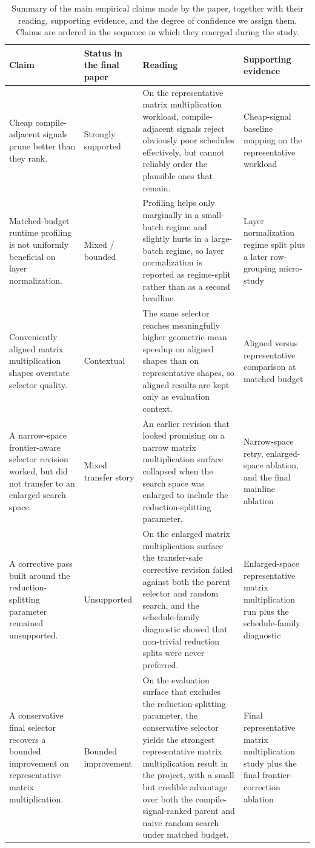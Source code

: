 \begin{table}[t]
\centering
\small
\begin{tabular}{p{}p{}p{}p{}}
\toprule
Claim & Status in the final paper & Reading & Supporting evidence \\
\midrule
Cheap compile-adjacent signals prune better than they rank. & Strongly supported & On the representative matrix multiplication workload, compile-adjacent signals reject obviously poor schedules effectively, but cannot reliably order the plausible ones that remain. & Cheap-signal baseline mapping on the representative workload \\
Matched-budget runtime profiling is not uniformly beneficial on layer normalization. & Mixed / bounded & Profiling helps only marginally in a small-batch regime and slightly hurts in a large-batch regime, so layer normalization is reported as regime-split rather than as a second headline. & Layer normalization regime split plus a later row-grouping micro-study \\
Conveniently aligned matrix multiplication shapes overstate selector quality. & Contextual & The same selector reaches meaningfully higher geometric-mean speedup on aligned shapes than on representative shapes, so aligned results are kept only as evaluation context. & Aligned versus representative comparison at matched budget \\
A narrow-space frontier-aware selector revision worked, but did not transfer to an enlarged search space. & Mixed transfer story & An earlier revision that looked promising on a narrow matrix multiplication surface collapsed when the search space was enlarged to include the reduction-splitting parameter. & Narrow-space retry, enlarged-space ablation, and the final mainline ablation \\
A corrective pass built around the reduction-splitting parameter remained unsupported. & Unsupported & On the enlarged matrix multiplication surface the transfer-safe corrective revision failed against both the parent selector and random search, and the schedule-family diagnostic showed that non-trivial reduction splits were never preferred. & Enlarged-space representative matrix multiplication run plus the schedule-family diagnostic \\
A conservative final selector recovers a bounded improvement on representative matrix multiplication. & Bounded improvement & On the evaluation surface that excludes the reduction-splitting parameter, the conservative selector yields the strongest representative matrix multiplication result in the project, with a small but credible advantage over both the compile-signal-ranked parent and naive random search under matched budget. & Final representative matrix multiplication study plus the final frontier-correction ablation \\
\bottomrule
\end{tabular}
\caption{Summary of the main empirical claims made by the paper, together with their reading, supporting evidence, and the degree of confidence we assign them. Claims are ordered in the sequence in which they emerged during the study.}
\label{tab:claims}
\end{table}
